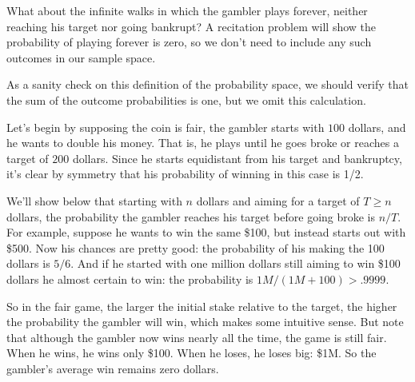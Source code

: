 \begin{editingnotes}
What about the infinite walks in which the gambler plays forever, neither
reaching his target nor going bankrupt?  A recitation problem will show the
probability of playing forever is zero, so we don't need to include any
such outcomes in our sample space.

As a sanity check on this definition of the probability space, we should
verify that the sum of the outcome probabilities is one, but we omit this
calculation.

\iffalse
To do this, we let $X$ be any string of $W$'s and $L$'s, and let $[X]$ be
the event consisting of the outcomes that begin with $X$.  If $X$ itself
is not an outcome but begins with an outcome, then $[X] = \emptyset$ so
$\pr{[X]} = 0$.  On the other hand, if no prefix of $X$ is an outcome,
then it's easy to verify by induction on $k$ that $\pr{[X]} = p^rq^{k-r}$.
length $k$

\textcolor{blue}{COMPLETE}

We'll leave this to the reader.

\fi

\end{editingnotes}



Let's begin by supposing the coin is fair, the gambler starts with $100$
dollars, and he wants to double his money.  That is, he plays until he
goes broke or reaches a target of $200$ dollars.  Since he starts
equidistant from his target and bankruptcy, it's clear by symmetry that
his probability of winning in this case is 1/2.

We'll show below that starting with $n$ dollars and aiming for a target of
$T \geq n$ dollars, the probability the gambler reaches his target before
going broke is $n/T$.  For example, suppose he wants to win the same \$100,
but instead starts out with \$500.  Now his chances are pretty good: the
probability of his making the 100 dollars is $5/6$.  And if he started
with one million dollars still aiming to win \$100 dollars he almost
certain to win: the probability is $1M/(1M + 100) > .9999$.

So in the fair game, the larger the initial stake relative to the
target, the higher the probability the gambler will win, which makes
some intuitive sense.  But note that although the gambler now wins
nearly all the time, the game is still fair.  When he wins, he wins
only \$100. When he loses, he loses big: \$1M.  So the gambler's
average win remains zero dollars.

